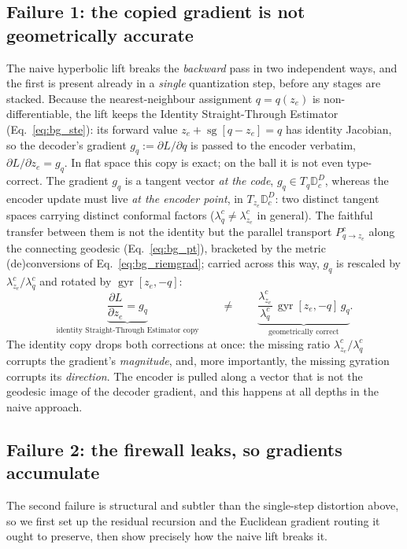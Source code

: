 \documentclass[12pt]{report}
\begin{document}
\subsection{Failure 1: the copied gradient is not geometrically accurate}
\label{sec:fail1}
The naive hyperbolic lift breaks the \emph{backward} pass in two independent ways, and the first is present already in a \emph{single} quantization step, before any stages are stacked. Because the nearest-neighbour assignment $q=q(z_e)$ is non-differentiable, the lift keeps the Identity Straight-Through Estimator (Eq.~\ref{eq:bg_ste}): its forward value $z_e+\operatorname{sg}[q-z_e]=q$ has identity Jacobian, so the decoder's gradient $g_q:=\partial L/\partial q$ is passed to the encoder verbatim, $\partial L/\partial z_e=g_q$. In flat space this copy is exact; on the ball it is not even type-correct. The gradient $g_q$ is a tangent vector \emph{at the code}, $g_q\in T_q\mathbb{D}_c^D$, whereas the encoder update must live \emph{at the encoder point}, in $T_{z_e}\mathbb{D}_c^D$: two distinct tangent spaces carrying distinct conformal factors ($\lambda^c_q\neq\lambda^c_{z_e}$ in general). The faithful transfer between them is not the identity but the parallel transport $P^c_{q\to z_e}$ along the connecting geodesic (Eq.~\ref{eq:bg_pt}), bracketed by the metric (de)conversions of Eq.~\ref{eq:bg_riemgrad}; carried across this way, $g_q$ is rescaled by $\lambda^c_{z_e}/\lambda^c_q$ and rotated by $\operatorname{gyr}[z_e,-q]$:
\begin{equation}
    \label{eq:failure1}
    \underbrace{\frac{\partial L}{\partial z_e} = g_q}_{\text{identity Straight-Through Estimator copy}}
    \qquad\neq\qquad
    \underbrace{\frac{\lambda^c_{z_e}}{\lambda^c_q}\,\operatorname{gyr}[z_e,-q]\,g_q}_{\text{geometrically correct}} .
\end{equation}
The identity copy drops both corrections at once: the missing ratio $\lambda^c_{z_e}/\lambda^c_q$ corrupts the gradient's \emph{magnitude}, and, more importantly, the missing gyration corrupts its \emph{direction}. The encoder is pulled along a vector that is not the geodesic image of the decoder gradient, and this happens at all depths in the naive approach.

\subsection{Failure 2: the firewall leaks, so gradients accumulate}
\label{sec:fail2}
The second failure is structural and subtler than the single-step distortion above, so we first set up the residual recursion and the Euclidean gradient routing it ought to preserve, then show precisely how the naive lift breaks it.
\end{document}
